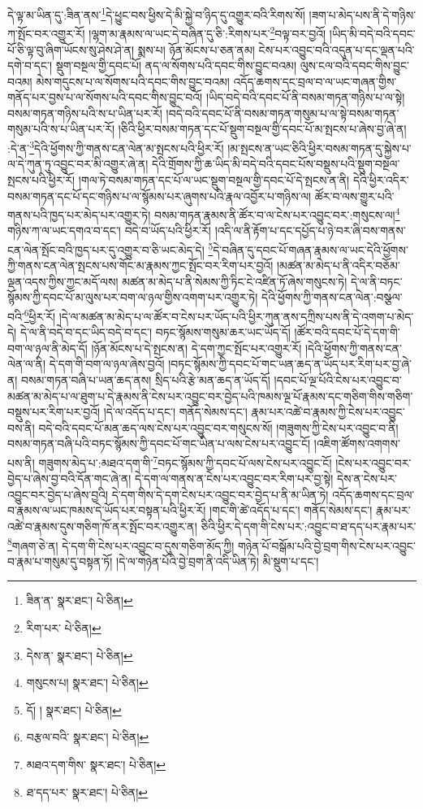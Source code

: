 དེ་ལྟ་མ་ཡིན་དུ་:ཟིན་ནས་\footnote{ཟིན་ན་  སྣར་ཐང་།  པེ་ཅིན། }དེ་ཕྱུང་བས་ཕྱིས་དེ་མི་སྐྱེ་བ་ཉིད་དུ་འགྱུར་བའི་རིགས་སོ། །ཟག་པ་མེད་པས་ནི་དེ་གཉིས་ཀ་སྤོང་བར་འགྱུར་རོ། །ལྷག་མ་རྣམས་ལ་ཡང་དེ་བཞིན་དུ་ཅི་:རིགས་པར་\footnote{རིག་པར་  པེ་ཅིན། }བལྟ་བར་བྱའོ། །ཡིད་མི་བདེ་བའི་དབང་པོ་ཅི་ལྟ་བུ་ཞིག་ཡོངས་སུ་ཤེས་ཤེ་ན། སྨས་པ། ཉོན་མོངས་པ་ཅན་ནམ། ངེས་པར་འབྱུང་བའི་འདུན་པ་དང་ལྡན་པའི་དགེ་བ་དང་། སྡུག་བསྔལ་གྱི་དབང་པོ། ནད་ལ་སོགས་པའི་དབང་གིས་བྱུང་བའམ། ལུས་ངལ་བའི་དབང་གིས་བྱུང་བའམ། མེས་གདུངས་པ་ལ་སོགས་པའི་དབང་གིས་བྱུང་བའམ། འདོད་ཆགས་དང་བྲལ་བ་ལ་ཡང་གཞན་གྱིས་གནོད་པར་བྱས་པ་ལ་སོགས་པའི་དབང་གིས་བྱུང་བའོ། །ཡིད་བདེ་བའི་དབང་པོ་ནི་བསམ་གཏན་གཉིས་པ་ལ་སྟེ། བསམ་གཏན་གཉིས་པའི་ས་པ་ཡིན་པར་རོ། །བདེ་བའི་དབང་པོ་ནི་བསམ་གཏན་གསུམ་པ་ལ་སྟེ་བསམ་གཏན་གསུམ་པའི་ས་པ་ཡིན་པར་རོ། །ཅིའི་ཕྱིར་བསམ་གཏན་དང་པོ་སྡུག་བསྔལ་གྱི་དབང་པོ་མ་སྤངས་པ་ཞེས་བྱ་ཞེ་ན། :དེ་ན་\footnote{དེས་ན་  སྣར་ཐང་།  པེ་ཅིན། }དེའི་ཕྱོགས་ཀྱི་གནས་ངན་ལེན་མ་སྤངས་པའི་ཕྱིར་རོ། །མ་སྤངས་ན་ཡང་ཅིའི་ཕྱིར་བསམ་གཏན་དུ་སྐྱེས་པ་ལ་དེ་ཀུན་ཏུ་འབྱུང་བར་མི་འགྱུར་ཞེ་ན། དེའི་གྲོགས་ཀྱི་ཆ་ཡིད་མི་བདེ་བའི་དབང་པོས་བསྡུས་པའི་སྡུག་བསྔལ་སྤངས་པའི་ཕྱིར་རོ། །གལ་ཏེ་བསམ་གཏན་དང་པོ་ལ་ཡང་སྡུག་བསྔལ་གྱི་དབང་པོ་དེ་སྤངས་ན་ནི། དེའི་ཕྱིར་འདིར་བསམ་གཏན་དང་པོ་དང་གཉིས་པ་ལ་སྙོམས་པར་ཞུགས་པའི་རྣལ་འབྱོར་པ་གཉིས་ལ། ཚོར་བ་ལས་གྱུར་པའི་གནས་པའི་ཁྱད་པར་མེད་པར་འགྱུར་ཏེ། བསམ་གཏན་རྣམས་ནི་ཚོར་བ་ལ་ངེས་པར་འབྱུང་བར་:གསུངས་ལ།\footnote{གསུངས་པ།  སྣར་ཐང་།  པེ་ཅིན། } གཉིས་ཀ་ལ་ཡང་དགའ་བ་དང་། བདེ་བ་ཡོད་པའི་ཕྱིར་རོ། །འདི་ལ་ནི་རྟོག་པ་དང་དཔྱོད་པ་ཉེ་བར་ཞི་བས་གནས་ངན་ལེན་སྤོང་བའི་ཁྱད་པར་དུ་འགྱུར་བ་ཅི་ཡང་མེད་དེ། \footnote{དོ། །   སྣར་ཐང་།  པེ་ཅིན། }དེ་བཞིན་དུ་དབང་པོ་གཞན་རྣམས་ལ་ཡང་དེའི་ཕྱོགས་ཀྱི་གནས་ངན་ལེན་སྤངས་པས་གོང་མ་རྣམས་ཀྱང་སྤོང་བར་རིག་པར་བྱའོ། །མཚན་མ་མེད་པ་ནི་འདིར་བཅོམ་ལྡན་འདས་ཀྱིས་ཀྱང་མདོ་ལས། མཚན་མ་མེད་པ་ནི་སེམས་ཀྱི་ཏིང་ངེ་འཛིན་ཏོ་ཞེས་གསུངས་ཏེ། དེ་ལ་ནི་བཏང་སྙོམས་ཀྱི་དབང་པོ་མ་ལུས་པར་བག་ལ་ཉལ་གྱིས་འགག་པར་འགྱུར་ཏེ། དེའི་ཕྱོགས་ཀྱི་གནས་ངན་ལེན་:བསྩལ་བའི་\footnote{བརྩལ་བའི་  སྣར་ཐང་།  པེ་ཅིན། }ཕྱིར་རོ། །དེ་ལ་མཚན་མ་མེད་པ་ལ་ཚོར་བ་ངེས་པར་ཡོད་པའི་ཕྱིར་ཀུན་ནས་དཀྲིས་པས་ནི་དེ་འགག་པ་མེད་དེ། དེ་ལ་ནི་བདེ་བ་དང་ཡིད་བདེ་བ་དང་། བཏང་སྙོམས་གསུམ་ཆར་ཡང་ཡོད་དོ། །ཚོར་བའི་དབང་པོ་དེ་དག་གི་བག་ལ་ཉལ་ནི་མེད་དོ། །ཉོན་མོངས་པ་དེ་སྤངས་ན། དེ་དག་ཀྱང་སྤོང་པར་འགྱུར་རོ། །དེའི་ཕྱོགས་ཀྱི་གནས་ངན་ལེན་ལ་ནི། དེ་དག་གི་བག་ལ་ཉལ་ཞེས་བྱའོ། །བཏང་སྙོམས་ཀྱི་དབང་པོ་གང་ཡན་ཆད་ན་ཡོད་པར་རིག་པར་བྱ་ཞེ་ན། བསམ་གཏན་བཞི་པ་ཡན་ཆད་ནས། སྲིད་པའི་རྩེ་མན་ཆད་ན་ཡོད་དོ། །དབང་པོ་ལྔ་པོའི་ངེས་པར་འབྱུང་བ་མཚན་མ་མེད་པ་ལ་ཐུག་པ་དེ་རྣམས་ནི་ངེས་པར་འབྱུང་བར་བྱེད་པའི་ཁམས་ལྔ་པོ་རྣམས་དང་གཅིག་གིས་གཅིག་བསྡུས་པར་རིག་པར་བྱའོ། །དེ་ལ་འདོད་པ་དང་། གནོད་སེམས་དང་། རྣམ་པར་འཚེ་བ་རྣམས་ཀྱི་ངེས་པར་འབྱུང་བས་ནི། བདེ་བའི་དབང་པོ་མན་ཆད་ལས་ངེས་པར་འབྱུང་བར་གསུངས་སོ། །གཟུགས་ཀྱི་ངེས་པར་འབྱུང་བ་ནི། བསམ་གཏན་བཞི་པའི་བཏང་སྙོམས་ཀྱི་དབང་པོ་གང་ཡིན་པ་ལས་ངེས་པར་འབྱུང་ངོ། །འཇིག་ཚོགས་འགགས་པས་ནི། གཟུགས་མེད་པ་:མཐའ་དག་གི་\footnote{མཐའ་དག་གིས་  སྣར་ཐང་།  པེ་ཅིན། }བཏང་སྙོམས་ཀྱི་དབང་པོ་ལས་ངེས་པར་འབྱུང་ངོ། །ངེས་པར་འབྱུང་བར་བྱེད་པ་ཞེས་བྱ་བའི་དོན་གང་ཞེ་ན། དེ་དག་ལ་གནས་ན་ངེས་པར་འབྱུང་བར་རིག་པར་བྱ་སྟེ། དེས་ན་ངེས་པར་འབྱུང་བར་བྱེད་པ་ཞེས་བྱའི། དེ་དག་གིས་དེ་དག་ངེས་པར་འབྱུང་བར་བྱེད་པ་ནི་མ་ཡིན་ཏེ། འདོད་ཆགས་དང་བྲལ་བ་རྣམས་ལ་ཡང་ཁམས་དེ་ཡོད་པར་བསྟན་པའི་ཕྱིར་རོ། །གང་གི་ཚེ་འདོད་པ་དང་། གནོད་སེམས་དང་། རྣམ་པར་འཚེ་བ་རྣམས་དུས་གཅིག་ཁོ་ནར་སྤོང་བར་འགྱུར་ན། ཅིའི་ཕྱིར་དེ་དག་གི་ངེས་པར་:འབྱུང་བ་ཐ་དད་པར་རྣམ་པར་\footnote{ཐ་དད་པར་  སྣར་ཐང་།  པེ་ཅིན། }གཞག་ཅེ་ན། དེ་དག་གི་ངེས་པར་འབྱུང་བ་དུས་གཅིག་མོད་ཀྱི། གཉེན་པོ་བསྒོམ་པའི་བྱེ་བྲག་གིས་ངེས་པར་འབྱུང་བ་རྣམ་པ་གསུམ་དུ་བསྟན་ཏོ། །དེ་ལ་གཉེན་པོའི་བྱེ་བྲག་ནི་འདི་ཡིན་ཏེ། མི་སྡུག་པ་དང་། 